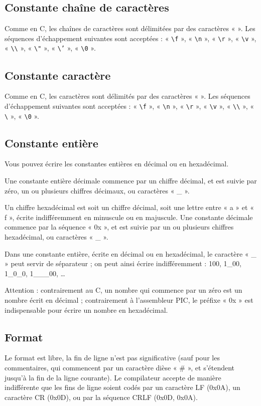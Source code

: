 \subsection{Constante chaîne de caractères}

Comme en C, les chaînes de caractères sont délimitées par des caractères « \texttt{\textquotedbl} ».  Les séquences d’échappement suivantes sont acceptées : « \texttt{\textbackslash f} », « \texttt{\textbackslash n} », « \texttt{\textbackslash r} », « \texttt{\textbackslash v} », « \texttt{\textbackslash\textbackslash} », « \texttt{\textbackslash"} », « \texttt{\textbackslash'} », « \texttt{\textbackslash 0} ».

\subsection{Constante caractère}

Comme en C, les caractères sont délimités par des caractères « \texttt{\textquotesingle} ».  Les séquences d’échappement suivantes sont acceptées : « \texttt{\textbackslash f} », « \texttt{\textbackslash n} », « \texttt{\textbackslash r} », « \texttt{\textbackslash v} », « \texttt{\textbackslash\textbackslash} », « \texttt{\textbackslash\textquotesingle} », « \texttt{\textbackslash 0} ».

\subsection{Constante entière}

Vous pouvez écrire les constantes entières en décimal ou en hexadécimal. 

Une constante entière décimale commence par un chiffre décimal, et est suivie par zéro, un ou plusieurs chiffres décimaux, ou caractères « \_ ».

Un chiffre hexadécimal est soit un chiffre décimal, soit une lettre entre « a » et « f », écrite indifféremment en minuscule ou en majuscule. Une constante décimale commence par la séquence « 0x », et est suivie par un ou plusieurs chiffres hexadécimal, ou caractères « \_ ».

Dans une constante entière, écrite en décimal ou en hexadécimal, le caractère « \_ » peut servir de séparateur ; on peut ainsi écrire indifféremment : 100, 1\_00, 1\_0\_0, 1\_\_\_00, …

Attention :
contrairement au C, un nombre qui commence par un zéro est un nombre écrit en décimal ;
contrairement à l’assembleur PIC, le préfixe « 0x » est indispensable pour écrire un nombre en hexadécimal.

\subsection{Format}

Le format est libre, la fin de ligne n’est pas significative (sauf pour les commentaires, qui commencent par un caractère dièse « \# », et s’étendent jusqu’à la fin de la ligne courante). Le compilateur accepte de manière indifférente que les fins de ligne soient codés par un caractère LF (0x0A), un caractère CR (0x0D), ou par la séquence CRLF (0x0D, 0x0A).

